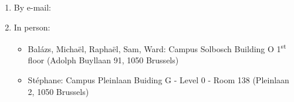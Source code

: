 \begin{enumerate}
\item  By e-mail:  \hpcinfo
\item  In person:
\begin{itemize}
\item  Bal\'azs, Micha\"el, Rapha\"el, Sam, Ward:
    Campus Solbosch Building O 1\textsuperscript{st} floor (Adolph Buyllaan 91, 1050 Brussels)
\item  St\'ephane:
    Campus Pleinlaan Buiding G - Level 0 - Room 138 (Pleinlaan 2, 1050 Brussels)
\end{itemize}
\end{enumerate}
